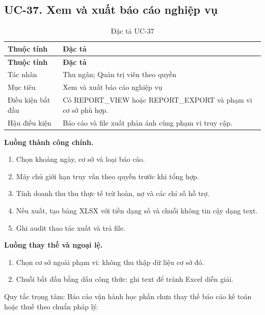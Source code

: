 \clearpage

\subsection{UC-37.\allowbreak{} Xem và xuất báo cáo nghiệp vụ}
\label{uc:37}

{\small\setlength{\tabcolsep}{3pt}\renewcommand{\arraystretch}{1.12}
\begin{longtable}{@{}L{\textwidth-1.32pt\relax} L{\textwidth-4.68pt\relax}@{}}
\caption{Đặc tả UC-37}\\
\toprule
\textbf{Thuộc tính} & \textbf{Đặc tả}\\\midrule
\endfirsthead
\toprule
\textbf{Thuộc tính} & \textbf{Đặc tả}\\\midrule
\endhead
\bottomrule\endlastfoot
Tác nhân & Thu ngân; Quản trị viên theo quyền\\[3pt]
Mục tiêu & Xem và xuất báo cáo nghiệp vụ\\[3pt]
Điều kiện bắt đầu & Có REPORT\_\allowbreak{}VIEW hoặc REPORT\_\allowbreak{}EXPORT và phạm vi cơ sở phù hợp.\allowbreak{}\\[3pt]
Hậu điều kiện & Báo cáo và file xuất phản ánh cùng phạm vi truy cập.\allowbreak{}\\[3pt]
\end{longtable}}
\noindent\textbf{Luồng thành công chính.}
\begin{enumerate}
\item Chọn khoảng ngày, cơ sở và loại báo cáo.\allowbreak{}
\item Máy chủ giới hạn truy vấn theo quyền trước khi tổng hợp.\allowbreak{}
\item Tính doanh thu thu thực tế trừ hoàn, nợ và các chỉ số hỗ trợ.\allowbreak{}
\item Nếu xuất, tạo bảng XLSX với tiền dạng số và chuỗi không tin cậy dạng text.\allowbreak{}
\item Ghi audit thao tác xuất và trả file.\allowbreak{}
\end{enumerate}
\noindent\textbf{Luồng thay thế và ngoại lệ.}
\begin{enumerate}
\item Chọn cơ sở ngoài phạm vi:\allowbreak{} không thu thập dữ liệu cơ sở đó.\allowbreak{}
\item Chuỗi bắt đầu bằng dấu công thức:\allowbreak{} ghi text để tránh Excel diễn giải.\allowbreak{}
\end{enumerate}
Quy tắc trọng tâm:\allowbreak{} Báo cáo vận hành học phần chưa thay thế báo cáo kế toán hoặc thuế theo chuẩn pháp lý.\allowbreak{}

